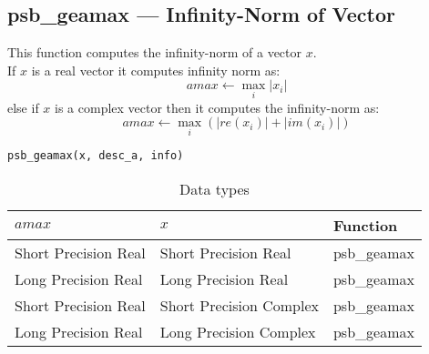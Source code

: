 \clearpage\subsection*{psb\_geamax --- Infinity-Norm of Vector}

This function computes 
 the infinity-norm of a vector $x$.\\
If $x$ is a real  vector
it computes infinity norm as:
\[ amax \leftarrow \max_i |x_i|\]
else if $x$ is a complex vector then it computes the infinity-norm  as:
\[ amax \leftarrow \max_i {(|re(x_i)| + |im(x_i)|)}\]

\begin{verbatim}
psb_geamax(x, desc_a, info)
\end{verbatim}

\begin{table}[h]
\begin{center}
\begin{tabular}{lll}
\hline
$amax$ & $x$ & {\bf Function}\\
\hline
Short Precision Real& Short Precision Real & psb\_geamax \\
Long Precision Real&Long Precision Real & psb\_geamax \\
Short Precision Real&Short Precision Complex & psb\_geamax \\
Long Precision Real&Long Precision Complex & psb\_geamax \\
\hline
\end{tabular}
\end{center}
\caption{Data types\label{tab:f90amax}}
\end{table}


